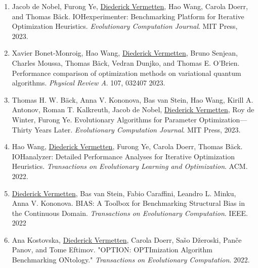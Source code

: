 \begin{enumerate}
	\item Jacob de Nobel, Furong Ye, \underline{Diederick Vermetten}, Hao Wang, Carola Doerr, and Thomas B{\"{a}}ck.  IOHexperimenter: Benchmarking Platform for Iterative Optimization Heuristics. 
    \emph{Evolutionary Computation Journal}. MIT Press, 2023. 

	\item Xavier Bonet-Monroig, Hao Wang, \underline{Diederick Vermetten}, Bruno Senjean, Charles Moussa, Thomas Bäck, Vedran Dunjko, and Thomas E. O'Brien. Performance comparison of optimization methods on variational quantum algorithms.
    \emph{Physical Review A}. 107, 032407 2023. 

        \item Thomas H. W. Bäck, Anna V. Kononova, Bas van Stein, Hao Wang, Kirill A. Antonov, Roman T. Kalkreuth, Jacob de Nobel, \underline{Diederick Vermetten}, Roy de Winter, Furong Ye. Evolutionary Algorithms for Parameter Optimization—Thirty Years Later.
    \emph{Evolutionary Computation Journal}. MIT Press, 2023.
    
        \item Hao Wang, \underline{Diederick Vermetten}, Furong Ye, Carola Doerr, Thomas Bäck. IOHanalyzer: Detailed Performance Analyses for Iterative Optimization Heuristics. 
    \emph{Transactions on Evolutionary Learning and Optimization}. ACM. 2022.
	
 	\item \underline{Diederick Vermetten}, Bas van Stein, Fabio Caraffini, Leandro L. Minku, Anna V. Kononova. BIAS: A Toolbox for Benchmarking Structural Bias in the Continuous Domain. 
    \emph{Transactions on Evolutionary Computation}. IEEE. 2022

        \item Ana Kostovska, \underline{Diederick Vermetten}, Carola Doerr, Sašo Džeroski, Panče Panov, and Tome Eftimov. "OPTION: OPTImization Algorithm Benchmarking ONtology."
        \emph{ Transactions on Evolutionary Computation}. 2022.
\end{enumerate}

